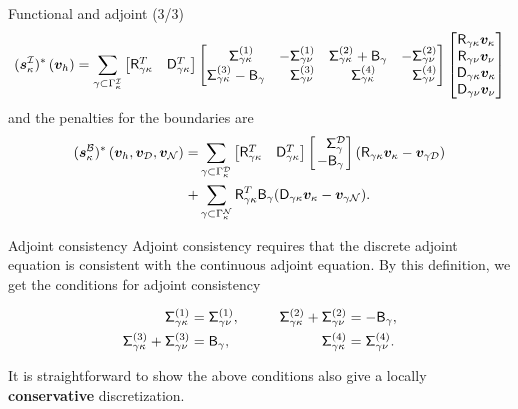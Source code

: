 \documentclass{beamer}
\begin{document}
\begin{frame}{Functional and adjoint (3/3)}
    \footnotesize
    \begin{equation*} \label{ad_interface_sat}
    (\bm{s}_{\kappa}^{\fnc{I}})^{*}\left(\bm{v}_{h}\right)
    = \sum_{\gamma \subset \Gamma_\kappa^\fnc{I}}
    \begin{bmatrix} \Rgk^T & \Dgk^T \end{bmatrix}
    \setlength{\arraycolsep}{7pt}
    \setlength{\arraycolsep}{5pt}
    \begin{bmatrix}
    \phnt{-}\Siggk{1}       & -\Siggn{1}      & \Siggk{2} + \Bg & -\Siggn{2} \\
    \Siggk{3} - \Bg & \phnt{-}\Siggn{3}       & \phnt{-}\Siggk{4}       & \phnt{-}\Siggn{4}
    \end{bmatrix}
    \begin{bmatrix} \Rgk \Vkp \\ \Rgn \Vnu \\ \Dgk \Vkp \\ \Dgn \Vnu \end{bmatrix} 
    \end{equation*}
    \normalsize
    and the penalties for the boundaries are
    \footnotesize
    \begin{equation*}
    \begin{aligned}
    (\bm{s}_{\kappa}^{\fnc{B}})^{*}\left(\bm{v}_{h}, \bm{v}_\fnc{D}, \bm{v}_\fnc{N}\right)
    =& \sum_{\gamma \subset \Gamma_\kappa^{\fnc{D}}}
    \begin{bmatrix} \Rgk^T & \Dgk^T \end{bmatrix}
    \begin{bmatrix} \phnt{-}\Sig_{\gamma}^{\fnc{D}} \\ -\Bg \end{bmatrix}
    (\Rgk \Vkp - \bm{v}_{\gamma\fnc{D}}) \\
    +& \sum_{\gamma \subset \Gamma_\kappa^{\fnc{N}}} \Rgk^{T}\B_{\gamma} (\Dgk \Vkp - \bm{v}_{\gamma\fnc{N}}).
    \end{aligned}
    \end{equation*} 
\end{frame}

\begin{frame}{Adjoint consistency}
    Adjoint consistency requires that the discrete adjoint equation is consistent with the continuous adjoint equation. By this definition, we get the conditions for adjoint consistency
    \begin{block}{}
        \begin{equation*}
        \begin{aligned}
        \mathsf{\Sigma}_{\gamma\kappa}^{(1)} &= \mathsf{\Sigma}_{\gamma\nu} ^{(1)}, &\qquad  
        \mathsf{\Sigma}_{\gamma\kappa}^{(2)} + \mathsf{\Sigma}_{\gamma\nu} ^{(2)} &= -\mathsf{B}_{\gamma}, \\
        \mathsf{\Sigma}_{\gamma\kappa}^{(3)} + \mathsf{\Sigma}_{\gamma\nu} ^{(3)} &= \mathsf{B}_{\gamma}, &\qquad
        \mathsf{\Sigma}_{\gamma\kappa}^{(4)} &= \mathsf{\Sigma}_{\gamma\nu} ^{(4)}.
        \end{aligned}
        \end{equation*}
    \end{block}

\vskip 5mm
It is straightforward to show the above conditions also give a locally \textbf{conservative} discretization.

\end{frame}
\end{document}
